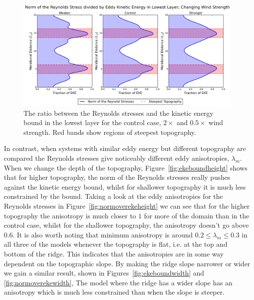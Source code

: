 \documentclass[12pt,a4paper]{report}
\newcommand*\figref[1]{Figure~\ref{#1}}
\begin{document}
\begin{figure}
	\centering
	\includegraphics[width=\linewidth]{normovereke_0_1}
	\caption{The ratio between the Reynolds stresses and the kinetic energy bound in
		the lowest layer for the control case, $2\times$ and $0.5\times$ wind strength.  Red bands show regions of steepest topography. }
	\label{fig:normoverekewindstrength}
\end{figure}

In contrast, when systems with similar eddy energy but different topography are compared
the Reynolds stresses give noticeably  different eddy anisotropies,
$\lambda_{m}$. When we change the depth of the topography, \figref{fig:ekeboundheight}
shows that for higher topography, the norm of the Reynolds stresses really pushes against
the kinetic energy bound, whilst for shallower topography it is much less constrained by the
bound. Taking a look at the  eddy anisotropies for the Reynolds stresses in 
\figref{fig:normoverekeheight} we can see that for the higher topography the anisotropy
is much closer to $1$ for more of the domain than in the control case, whilst for the
 shallower topography, the  anisotropy doesn't go above $0.6$. It is also worth
 noting that minimum anisotropy is around $0.2 \leq \lambda_{m} \leq 0.3$ in
 all three of the models whenever the topography is flat, i.e. at the top and bottom of 
 the ridge. This indicates that the anisotropies are in some way dependent on 
 the topographic slope. By making the ridge slope narrower or wider we gain a similar
 result, shown in Figures~\ref{fig:ekeboundwidth} and \ref{fig:normoverekewidth},
 The model where the ridge has a wider slope has an anisotropy which is much less
 constrained than when the slope is steeper.  
\end{document}
